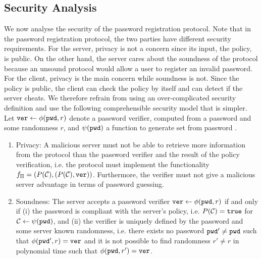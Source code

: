 \subsection{Security Analysis} \label{sec:bpr:security}
We now analyse the security of the password registration protocol. Note that in the password registration protocol, the two parties have different security requirements. For the server, privacy is not a concern since its input, the policy, is public. On the other hand, the server cares about the soundness of the protocol because an unsound protocol would allow a user to register an invalid password. For the client, privacy is the main concern while soundness is not. Since the policy is public, the client can check the policy by itself and can detect if the server cheats. 
We therefore refrain from using an over-complicated security definition and use the following comprehensible security model that is simpler. Let $\mathtt{ver}\gets\phi(\mathtt{pwd},r)$ denote a password verifier, computed from a password \pwd and some randomness $r$, and $\psi(\mathtt{pwd})$ a function to generate set \cC from password \pwd.
\begin{enumerate}
  \item Privacy: A malicious server must not be able to retrieve more information from the protocol than the password verifier and the result of the policy verification, i.e. the protocol must implement the functionality $f_{\Pi}=(P(\mathcal{C}), (P(\mathcal{C}), \mathtt{ver}))$. Furthermore, the verifier must not give a malicious server advantage in terms of password guessing. 
  \item Soundness: The server accepts a password verifier $\mathtt{ver}\gets\phi(\mathtt{pwd},r)$ if and only if (i) the password is compliant with the server's policy, i.e. $P(\mathcal{C})=\mathtt{true}$ for $\mathcal{C}\gets\psi(\mathtt{pwd})$, and (ii) the verifier is uniquely defined by the password and some server known randomness, i.e. there exists no password $\mathtt{pwd}'\not=\mathtt{pwd}$ such that $\phi(\mathtt{pwd}',r)=\mathtt{ver}$ and it is not possible to find randomness $r'\not=r$ in polynomial time such that $\phi(\mathtt{pwd},r')=\mathtt{ver}$.
\end{enumerate}



